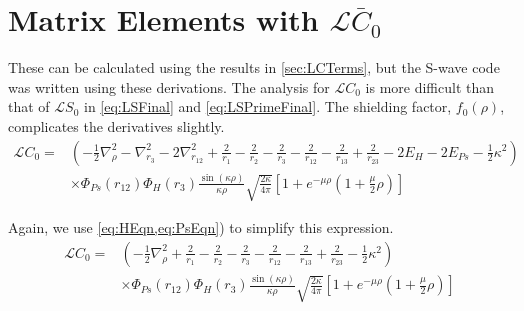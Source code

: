 \documentclass[Dissertation.tex]{subfiles}
\begin{document}
\section{Matrix Elements with \texorpdfstring{$\mathcal{L}\bar{C}_0$}{LC}}
\label{sec:LCElements}

These can be calculated using the results in \cref{sec:LCTerms}, but the S-wave
code was written using these derivations.%
The analysis for $\mathcal{L}C_0$ is more difficult than that of
$\mathcal{L}S_0$ in \cref{eq:LSFinal} and \cref{eq:LSPrimeFinal}.
The shielding factor, $f_0(\rho)$, complicates the derivatives slightly.
\begin{align}
\mathcal{L}C_0 = & \left(-\frac{1}{2}\nabla_\rho^2 - \nabla_{r_3}^2 - 2\nabla_{r_{12}}^2 + \frac{2}{r_1} - \frac{2}{r_2} - \frac{2}{r_3} - \frac{2}{r_{12}} - \frac{2}{r_{13}} + \frac{2}{r_{23}} - 2 E_H - 2 E_{Ps} - \frac{1}{2}\kappa^2 \right) \nonumber \\
 & \times \Phi_{Ps}(r_{12}) \Phi_H(r_3) \frac{\sin(\kappa\rho)}{\kappa\rho} \sqrt{\frac{2\kappa}{4\pi}} \left[1 + e^{-\mu\rho} \left(1 + \frac{\mu}{2} \rho \right) \right]
\label{eq:LC1}
\end{align}

\noindent Again, we use \cref{eq:HEqn,eq:PsEqn}) to simplify this expression.
\begin{align}
\mathcal{L}C_0 = & \left(-\frac{1}{2}\nabla_\rho^2 + \frac{2}{r_1} - \frac{2}{r_2} - \frac{2}{r_3} - \frac{2}{r_{12}} - \frac{2}{r_{13}} + \frac{2}{r_{23}}  - \frac{1}{2}\kappa^2\right) \nonumber \\
 & \times \Phi_{Ps}(r_{12}) \Phi_H(r_3) \frac{\sin(\kappa\rho)}{\kappa\rho} \sqrt{\frac{2\kappa}{4\pi}} \left[1 + e^{-\mu\rho} \left(1 + \frac{\mu}{2} \rho \right) \right]
\label{eq:LC2}
\end{align}
\end{document}
